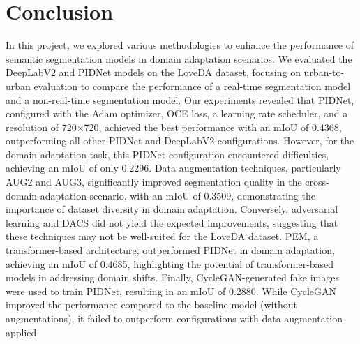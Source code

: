 \documentclass[10pt,twocolumn,letterpaper]{article}
\begin{document}
\section{Conclusion}

In this project, we explored various methodologies to enhance the performance of semantic segmentation models in domain adaptation scenarios. We evaluated the DeepLabV2 and PIDNet models on the LoveDA dataset, focusing on urban-to-urban evaluation to compare the performance of a real-time segmentation model and a non-real-time segmentation model. Our experiments revealed that PIDNet, configured with the Adam optimizer, OCE loss, a learning rate scheduler, and a resolution of 720×720, achieved the best performance with an mIoU of 0.4368, outperforming all other PIDNet and DeepLabV2 configurations. However, for the domain adaptation task, this PIDNet configuration encountered difficulties, achieving an mIoU of only 0.2296. Data augmentation techniques, particularly AUG2 and AUG3, significantly improved segmentation quality in the cross-domain adaptation scenario, with an mIoU of 0.3509, demonstrating the importance of dataset diversity in domain adaptation. Conversely, adversarial learning and DACS did not yield the expected improvements, suggesting that these techniques may not be well-suited for the LoveDA dataset. PEM, a transformer-based architecture, outperformed PIDNet in domain adaptation, achieving an mIoU of 0.4685, highlighting the potential of transformer-based models in addressing domain shifts. Finally, CycleGAN-generated fake images were used to train PIDNet, resulting in an mIoU of 0.2880. While CycleGAN improved the performance compared to the baseline model (without augmentations), it failed to outperform configurations with data augmentation applied.




\end{document}

